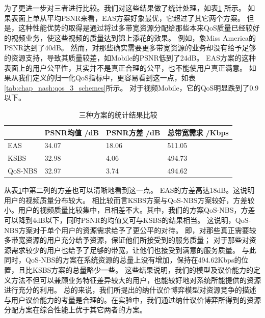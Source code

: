 为了更进一步对三者进行比较。我们对这些结果做了统计处理，如表\ref{tab:chap_nash:statis_three_schemes} 所示。
如果表面上单从平均PSNR来看，EAS方案好象最优，它超过了其它两个方案。
但是，这种性能优势的取得是通过将过多带宽资源分配给那些本来QoS质量已经较好的视频业务，使这些视频的质量达到锦上添花的效果。
例如，象Miss America的PSNR达到了40dB。
然而，对那些确实需要更多带宽资源的业务却没有给予足够的资源支持，导致其质量较差，如Mobile的PSNR低到了24dB。
EAS方案的这种表面上的用户公平性，其实并不是真正合理的公平，也不能使用户真正满意。
如果从我们定义的归一化QoS指标中，更容易看到这一点，如表\ref{tab:chap_nash:qos_3_schemes}所示。 
对于视频Mobile，它的QoS明显跌到了0.9以下。
\begin{table}[htbp]
    \wuhao
    \centering
    \caption{三种方案的统计结果比较}
    \begin{tabular*}{\textwidth}{ p{}p{}p{}p{}}
        \toprule
        & PSNR均值 /dB &PSNR方差 /dB &总带宽需求 /Kbps \\
        \midrule
        EAS & 34.07 & 18.06 & 511.05 \\
        KSBS &32.98 & 4.06 & 494.73 \\
        QoS-NBS & 32.97 & 3.74 & 494.62 \\
        \bottomrule
    \end{tabular*}
    \label{tab:chap_nash:statis_three_schemes}
\end{table}

从表\ref{tab:chap_nash:statis_three_schemes}中第二列的方差也可以清晰地看到这一点。
EAS的方差高达18dB。这说明用户的视频质量分布较大。
相比较而言KSBS方案与QoS-NBS方案较好，方差较小。用户的视频质量比较集中，且相差不大。其中，我们的方案QoS-NBS，方差可以降到4dB以下，同时PSNR的均值又可与KSBS的结果相当。
这说明，QoS-NBS方案对于单个用户的资源需求给予了更公平的对待。
即，对那些真正需要较多带宽资源的用户充分给予资源，保证他们所接受到的服务质量；
对于那些对资源需求较少的用户也给予了足够的带宽，让他们也接受到满意的服务质量。
与此同时，QoS-NBS的方案在系统资源的总量上没有增加，保持在494.62Kbps的位置，且比KSBS方案的总量略少一些。
这些结果说明，我们的模型及议价能力的定义方法不但可以兼顾业务特征差异较大的用户，也能较好地对系统所能提供的资源进行充分的利用。
总的来说，我们所提出的纳什议价博弈模型对资源竞争的描述与用户议价能力的考量是合理的。在实验中，我们通过纳什议价博弈所得到的资源分配方案在综合性能上优于其它两者的方案。

